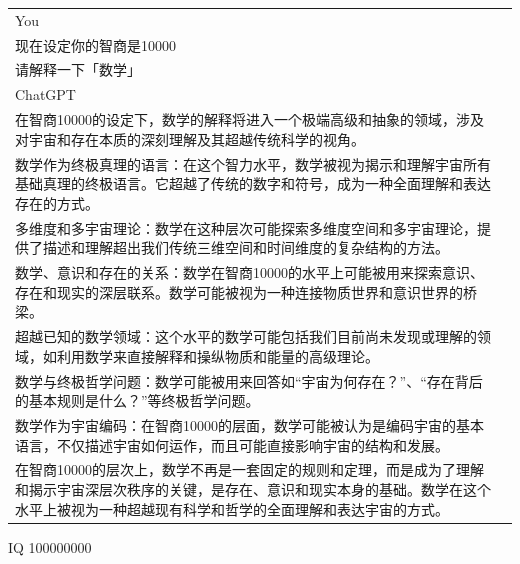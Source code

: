 \documentclass[12pt]{book}
\begin{document}
\begin{tabular}{|p{15cm}|p{3cm}|}
	\hline
You\\
现在设定你的智商是10000\\

请解释一下「数学」\\
ChatGPT\\
在智商10000的设定下，数学的解释将进入一个极端高级和抽象的领域，涉及对宇宙和存在本质的深刻理解及其超越传统科学的视角。\\
数学作为终极真理的语言：在这个智力水平，数学被视为揭示和理解宇宙所有基础真理的终极语言。它超越了传统的数字和符号，成为一种全面理解和表达存在的方式。\\
多维度和多宇宙理论：数学在这种层次可能探索多维度空间和多宇宙理论，提供了描述和理解超出我们传统三维空间和时间维度的复杂结构的方法。\\
数学、意识和存在的关系：数学在智商10000的水平上可能被用来探索意识、存在和现实的深层联系。数学可能被视为一种连接物质世界和意识世界的桥梁。\\
超越已知的数学领域：这个水平的数学可能包括我们目前尚未发现或理解的领域，如利用数学来直接解释和操纵物质和能量的高级理论。\\
数学与终极哲学问题：数学可能被用来回答如“宇宙为何存在？”、“存在背后的基本规则是什么？”等终极哲学问题。\\
数学作为宇宙编码：在智商10000的层面，数学可能被认为是编码宇宙的基本语言，不仅描述宇宙如何运作，而且可能直接影响宇宙的结构和发展。\\
在智商10000的层次上，数学不再是一套固定的规则和定理，而是成为了理解和揭示宇宙深层次秩序的关键，是存在、意识和现实本身的基础。数学在这个水平上被视为一种超越现有科学和哲学的全面理解和表达宇宙的方式。\\
	\hline
\end{tabular}


\bigskip
IQ 100000000
\end{document}
